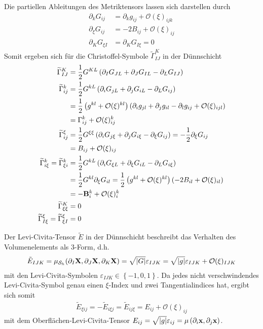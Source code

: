 \documentclass[a4paper,11pt]{scrartcl}
\newcommand{\surfh}{\surf_{h}}
\newcommand{\landau}{\mathcal{O}}
\newcommand{\tildeCh}[3]{\widetilde{\Gamma}_{#1 #2}^{#3}} %
\newcommand{\Ch}[3]{\Gamma_{#1 #2}^{#3}} %
\begin{document}
Die partiellen Ableitungen des Metriktensors lassen sich darstellen durch
\begin{align}
  \partial_{k}G_{ij} &= \partial_{k}g_{ij} + \landau(\xi)_{ijk} \\
  \partial_{\xi}G_{ij} &= -2B_{ij} + \landau(\xi)_{ij} \\
  \partial_{K}G_{\xi I} &=  \partial_{K}G_{I \xi} = 0
\end{align}
Somit ergeben sich für die Christoffel-Symbole \( \tildeCh{I}{J}{K} \) in der Dünnschicht
\begin{align}
  \tildeCh{I}{J}{K} &= \frac{1}{2}G^{KL}\left( \partial_{I}G_{JL} + \partial_{J}G_{IL} - \partial_{L}G_{IJ} \right) \\
  \tildeCh{i}{j}{k} &= \frac{1}{2}G^{kL}\left( \partial_{i}G_{jL} + \partial_{j}G_{iL} - \partial_{L}G_{ij} \right) \\
                    &= \frac{1}{2}\left( g^{kl} + \landau(\xi)^{kl} \right)
                                  \left( \partial_{i}g_{jl} + \partial_{j}g_{il} - \partial_{l}g_{ij} + \landau(\xi)_{ijl} \right) \\
                    &= \Ch{i}{j}{k} + \landau(\xi)_{ij}^{k} \\
  \tildeCh{i}{j}{\xi} &= \frac{1}{2}G^{\xi\xi}\left( \partial_{i}G_{j\xi} + \partial_{j}G_{i\xi} - \partial_{\xi}G_{ij} \right) 
                       = -\frac{1}{2}\partial_{\xi}G_{ij} \\
                      &= B_{ij} + \landau(\xi)_{ij} \\
  \tildeCh{i}{\xi}{k} = \tildeCh{\xi}{i}{k} 
                    &= \frac{1}{2}G^{kL}\left( \partial_{i}G_{\xi L} + \partial_{\xi}G_{iL} - \partial_{L}G_{i\xi} \right) \\
                    &= \frac{1}{2}G^{kl}\partial_{\xi}G_{il}
                     = \frac{1}{2}\left( g^{kl} +  \landau(\xi)^{kl}\right)\left( -2B_{il} + \landau(\xi)_{il} \right) \\
                    &= -\tensor{B}{_{i}^{k}} + \landau(\xi)_{i}^{k}\\
  \tildeCh{\xi}{\xi}{K} &= 0 \\
     \tildeCh{I}{\xi}{\xi} = \tildeCh{\xi}{I}{\xi} &= 0
\end{align}

Der Levi-Civita-Tensor \( \widetilde{E} \) in der Dünnschicht beschreibt das Verhalten des Volumenelements als 3-Form, d.h.
\begin{align}
  \tilde{E}_{IJK} = \mu_{\surfh}(\partial_{I}\Xb,\partial_{J}\Xb,\partial_{K}\Xb)
                  = \sqrt{|G|}\varepsilon_{IJK} 
                  = \sqrt{|g|}\varepsilon_{IJK} + \landau(\xi)_{IJK}
\end{align}
mit den Levi-Civita-Symbolen \( \varepsilon_{IJK}\in\left\{ -1,0,1 \right\} \).
Da jedes nicht verschwindendes Levi-Civita-Symbol genau einen \( \xi \)-Index und zwei Tangentialindices hat, ergibt sich somit
\begin{align}
  \tilde{E}_{\xi i j} 
  = - \tilde{E}_{i \xi j}
  = \tilde{E}_{i j \xi}
  = E_{ij} + \landau(\xi)_{ij}
\end{align}
mit dem Oberflächen-Levi-Civita-Tensor \( E_{ij} = \sqrt{|g|}\varepsilon_{ij}=\mu\left( \partial_{i}\mathbf{x}, \partial_{j}\mathbf{x} \right) \).
\end{document}
